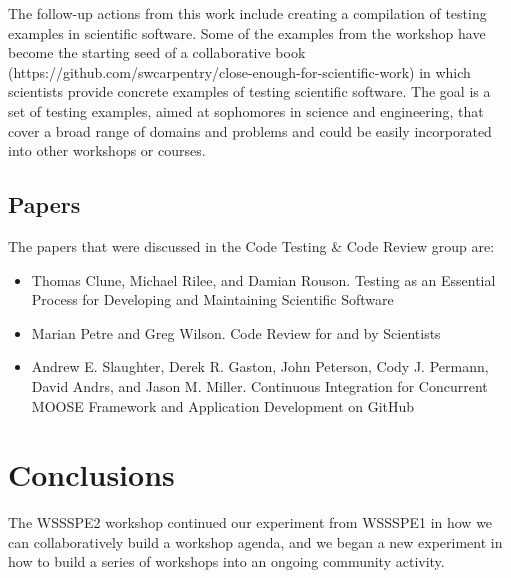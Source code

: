 \documentclass[11pt, oneside]{amsart}
\newcommand{\katznote}[1]{ {\textcolor{magenta}    { ***Dan:      #1 }}}
\newcommand{\clunenote}[1]{ {\textcolor{orange}    { ***Tom:      #1 }}}
\begin{document}
The follow-up actions from this work include creating a compilation of testing
examples in scientific software. Some of the examples from the workshop have
become the starting seed of a collaborative book
(https://github.com/swcarpentry/close-enough-for-scientific-work) in which
scientists provide concrete examples of testing scientific software. The goal is
a set of testing examples, aimed at sophomores in science and engineering, that
cover a broad range of domains and problems and could be easily incorporated
into other workshops or courses.
 


\subsection{Papers}

The papers that were discussed in the Code Testing \& Code Review group are:
\begin{itemize}
\item Thomas Clune, Michael Rilee, and Damian Rouson. Testing as an Essential
Process for Developing and Maintaining Scientific Software~\cite{wssspe2_clune}

\item Marian Petre and Greg Wilson. Code Review for and by
Scientists~\cite{wssspe2_petre}

\item Andrew E. Slaughter, Derek R. Gaston, John Peterson, Cody J. Permann,
David Andrs, and Jason M. Miller. Continuous Integration for Concurrent {MOOSE}
Framework and Application Development on {GitHub}~\cite{wssspe2_slaughter}
\end{itemize}

\section{Conclusions} \label{sec:conclusions}

The WSSSPE2 workshop continued our experiment from WSSSPE1 in how we can
collaboratively build a workshop agenda, and we began a new experiment in
how to build a series of workshops into an ongoing community activity.
\end{document}
